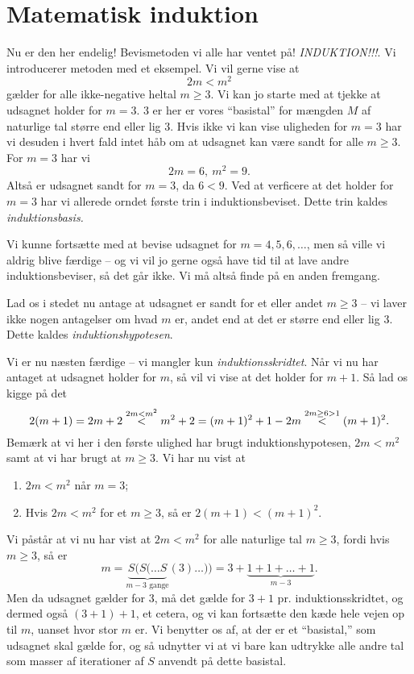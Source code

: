 \documentclass[a4paper, 12pt]{article}
\numberwithin{equation}{section}
\theoremstyle{plain}
\theoremstyle{definition}
\begin{document}
\section{Matematisk induktion}
Nu er den her endelig! Bevismetoden vi alle har ventet på! \emph{INDUKTION!!!}. Vi introducerer metoden med et eksempel. Vi vil gerne vise at 
\[
  2m<m^2
\]
gælder for alle ikke-negative heltal \(m\ge 3\). Vi kan jo starte med at tjekke at udsagnet holder for \(m=3\). 3 er her er vores ``basistal'' for mængden \(M\) af naturlige tal større end eller lig 3. Hvis ikke vi kan vise uligheden for \(m=3\) har vi desuden i hvert fald intet håb om at udsagnet kan være sandt for alle \(m\ge 3\). For \(m=3\) har vi
\[
  2m=6,\ m^2=9.
  \]
  Altså er udsagnet sandt for \(m=3\), da \(6<9\). Ved at verficere at det holder for \(m=3\) har vi allerede orndet første trin i induktionsbeviset. Dette trin kaldes \emph{induktionsbasis.}

  Vi kunne fortsætte med at bevise udsagnet for \(m=4,5,6,\ldots\), men så ville vi aldrig blive færdige -- og vi vil jo gerne også have tid til at lave andre induktionsbeviser, så det går ikke. Vi må altså finde på en anden fremgang.

  Lad os i stedet nu antage at udsagnet er sandt for et eller andet \(m\ge 3\) -- vi laver ikke nogen antagelser om hvad \(m\) er, andet end at det er større end eller lig 3. Dette kaldes \emph{induktionshypotesen}.

  Vi er nu næsten færdige -- vi mangler kun \emph{induktionsskridtet}. Når vi nu har antaget at udsagnet holder for \(m\), så vil vi vise at det holder for \(m+1\). Så lad os kigge på det
  \[
    2(m+1)=2m+2\buildrel{2m<m^2}\over{<}m^2+2=(m+1)^2+1-2m\buildrel{2m\ge 6>1}\over <(m+1)^2.
    \]
    Bemærk at vi her i den første ulighed har brugt induktionshypotesen, \(2m<m^2\) samt at vi har brugt at \(m\ge 3\). Vi har nu vist at
    \begin{enumerate}
    \item \(2m<m^2\) når \(m=3\);
      \item Hvis \(2m<m^2\) for et \(m\ge 3\), så er \(2(m+1)<(m+1)^2\).
    \end{enumerate}
    Vi påstår at vi nu har vist at \(2m<m^2\) for alle naturlige tal \(m\ge 3\), fordi hvis \(m\ge 3\), så er
    \[
      m=\underbrace{S(S(\ldots S}_{m-3\text{ gange}}(3)\ldots))=3+\underbrace{1+1+\ldots+1}_{m-3}.
      \]
      Men da udsagnet gælder for 3, må det gælde for \(3+1\) pr. induktionsskridtet, og dermed også \((3+1)+1\), et cetera, og vi kan fortsætte den kæde hele vejen op til \(m\), uanset hvor stor \(m\) er. Vi benytter os af, at der er et ``basistal,'' som udsagnet skal gælde for, og så udnytter vi at vi bare kan udtrykke alle andre tal som masser af iterationer af \(S\) anvendt på dette basistal.
\end{document}
